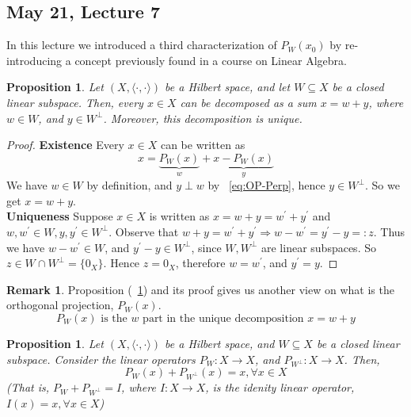 \documentclass[11pt]{amsart}
\newtheorem{proposition}[theorem]{Proposition}
\theoremstyle{definition}
\newtheorem{remark}[theorem]{Remark}
\numberwithin{equation}{section}
\newcommand{\ips}{ \left( X, \langle \cdot, \cdot \rangle \right) }		%
\begin{document}
\vspace{6pt}

\subsection{May 21, Lecture 7} In this lecture we introduced a third characterization of $P_W(x_0)$ by re-introducing a concept previously found in a course on Linear Algebra. 

\begin{proposition}\label{prop:37}
Let $\ips$ be a Hilbert space, and let $W \subseteq X$ be a closed linear subspace. Then, every $x \in X$ can be decomposed as a sum $x = w + y$, where $w \in W$, and $y \in W^\perp$. Moreover, this decomposition is unique. 
 \end{proposition}

\vspace{6pt}

\begin{proof} \textbf{Existence} Every $x \in X$ can be written as 
\[ x = \underbrace{P_W(x)}_{w} + \underbrace{x - P_W(x)}_{y}\] 
We have $w \in W$ by definition, and $y \perp w$ by ~\ref{eq:OP-Perp}, hence $ y \in W^\perp$. So we get $x = w + y$. \\

\noindent \textbf{Uniqueness} Suppose $x\in X$ is written as $x = w + y = w^\prime + y^\prime$ and $w,w^\prime \in W, y,y^\prime \in W^\perp$. 
Observe that $w + y = w^\prime + y^\prime \Rightarrow w-w^\prime = y^\prime - y =: z$. Thus we have $w-w^\prime \in W$, and $y^\prime - y \in W^\perp$, since $W,W^\perp$ are linear subspaces. So $z \in W \cap W^\perp = \{0_X\}$. Hence $z = 0_X$, therefore $w=w^\prime$, and $y^\prime = y$. 
\end{proof}

\newpage

\begin{remark}\label{rem:38} Proposition (~\ref{prop:37}) and its proof gives us another view on what is the orthogonal projection, $P_W(x)$. 
\[\label{eq:OP-3} \tag{OP 3} P_W(x) \mbox{ is the } w \mbox{ part in the unique decomposition } x = w + y \]
\end{remark}

\vspace{6pt}

\begin{proposition}\label{prop:39} Let $\ips$ be a Hilbert space, and $W \subseteq X$ be a closed linear subspace. Consider the linear operators $P_W:X\rightarrow X$, and $P_{W^\perp}:X\rightarrow X$. Then, 
\[P_W(x) + P_{W^\perp}(x) = x, \forall x \in X \]
(That is, $P_W + P_{W^\perp} = I$, where $I:X\rightarrow X$, is the idenity linear operator, $I(x) = x, \forall x \in X$) 
\end{proposition}
\end{document}
